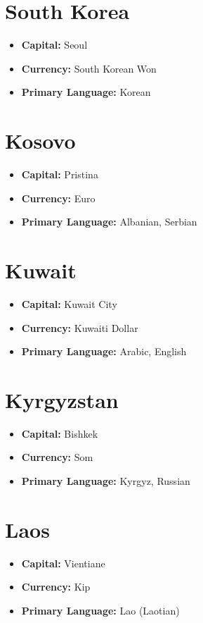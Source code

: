 \documentclass[a4paper,100pt,twoside]{book}
\begin{document}
\section*{\Huge South Korea}
\vspace{5mm} %
\begin{itemize}
	\item \textbf{Capital:} Seoul
	\item \textbf{Currency:} South Korean Won
	\item \textbf{Primary Language:} Korean
\end{itemize}

\section*{\Huge Kosovo}
\vspace{5mm} %
\begin{itemize}
	\item \textbf{Capital:} Pristina
	\item \textbf{Currency:} Euro
	\item \textbf{Primary Language:} Albanian, Serbian
\end{itemize}

\section*{\Huge Kuwait}
\vspace{5mm} %
\begin{itemize}
	\item \textbf{Capital:} Kuwait City
	\item \textbf{Currency:} Kuwaiti Dollar
	\item \textbf{Primary Language:} Arabic, English
\end{itemize}

\section*{\Huge Kyrgyzstan}
\vspace{5mm} %
\begin{itemize}
	\item \textbf{Capital:} Bishkek
	\item \textbf{Currency:} Som
	\item \textbf{Primary Language:} Kyrgyz, Russian
\end{itemize}

\section*{\Huge Laos}
\vspace{5mm} %
\begin{itemize}
	\item \textbf{Capital:} Vientiane
	\item \textbf{Currency:} Kip
	\item \textbf{Primary Language:} Lao (Laotian)
\end{itemize}
\end{document}
